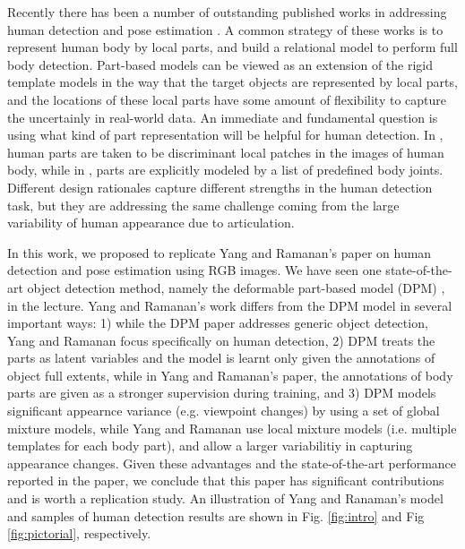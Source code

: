 \documentclass[10pt,twocolumn,letterpaper]{article}
\begin{document}
Recently there has been a number of outstanding published works in addressing human detection and pose estimation \cite{Bourdev_ICCV2009, Bourdev_ECCV2010, Felzenszwalb_PAMI2010, Yang_PAMI2011, Shotton_CVPR2011}. A common strategy of these works is to represent human body by local parts, and build a relational model to perform full body detection. Part-based models can be viewed as an extension of the rigid template models in the way that the target objects are represented by local parts, and the locations of these local parts have some amount of flexibility to capture the uncertainly in real-world data. An immediate and fundamental question is using what kind of part representation will be helpful for human detection. In \cite{Bourdev_ICCV2009, Bourdev_ECCV2010, Felzenszwalb_PAMI2010}, human parts are taken to be discriminant local patches in the images of human body, while in \cite{Yang_PAMI2011}, parts are explicitly modeled by a list of predefined body joints. Different design rationales capture different strengths in the human detection task, but they are addressing the same challenge coming from the large variability of human appearance due to articulation.

In this work, we proposed to replicate Yang and Ramanan's paper \cite{Yang_PAMI2011} on human detection and pose estimation using RGB images. We have seen one state-of-the-art object detection method, namely the deformable part-based model (DPM) \cite{Felzenszwalb_PAMI2010}, in the lecture. Yang and Ramanan's work differs from the DPM model in several important ways: 1) while the DPM paper addresses generic object detection, Yang and Ramanan focus specifically on human detection, 2) DPM treats the parts as latent variables and the model is learnt only given the annotations of object full extents, while in Yang and Ramanan's paper, the annotations of body parts are given as a stronger supervision during training, and 3) DPM models significant appearnce variance (e.g. viewpoint changes) by using a set of global mixture models, while Yang and Ramanan use local mixture models (i.e. multiple templates for each body part), and allow a larger variabilitiy in capturing appearance changes. Given these advantages and the state-of-the-art performance reported in the paper, we conclude that this paper has significant contributions and is worth a replication study. An illustration of Yang and Ranaman's model and samples of human detection results are shown in Fig. \ref{fig:intro} and Fig \ref{fig:pictorial}, respectively.
\end{document}

